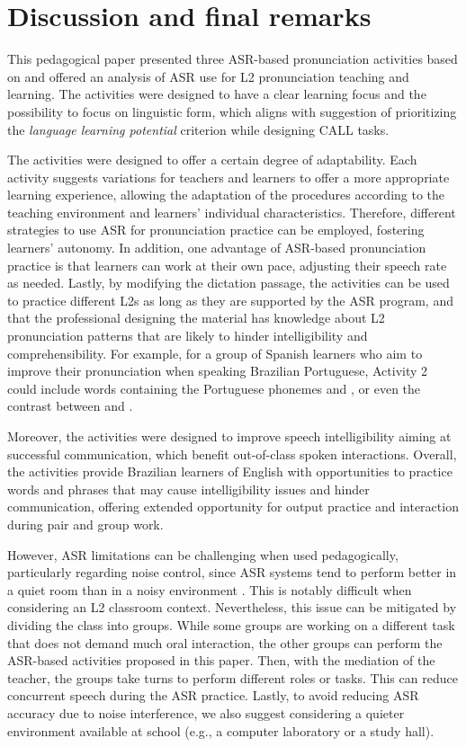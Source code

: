\documentclass[english]{textolivre}
\begin{document}
\section{Discussion and final
remarks}\label{sec-discussion}

This pedagogical paper presented three ASR-based pronunciation
activities based on \textcite{gottardi2023} and offered an analysis of ASR use
for L2 pronunciation teaching and learning. The activities were designed
to have a clear learning focus and the possibility to focus on
linguistic form, which aligns with \textcite{chapelle2001} suggestion of
prioritizing the \emph{language learning potential} criterion while
designing CALL tasks.


The activities were designed to offer a certain degree of adaptability.
Each activity suggests variations for teachers and learners to offer a
more appropriate learning experience, allowing the adaptation of the
procedures according to the teaching environment and learners'
individual characteristics. Therefore, different strategies to use ASR
for pronunciation practice can be employed, fostering learners'
autonomy. In addition, one advantage of ASR-based pronunciation practice
is that learners can work at their own pace, adjusting their speech rate
as needed. Lastly, by modifying the dictation passage, the activities
can be used to practice different L2s as long as they are supported by
the ASR program, and that the professional designing the material has
knowledge about L2 pronunciation patterns that are likely to hinder
intelligibility and comprehensibility. For example, for a group of
Spanish learners who aim to improve their pronunciation when speaking
Brazilian Portuguese, Activity 2 could include words containing the
Portuguese phonemes  and , or even the contrast between  and .

Moreover, the activities were designed to improve speech intelligibility
aiming at successful communication, which benefit out-of-class spoken
interactions. Overall, the activities provide Brazilian learners of
English with opportunities to practice words and phrases that may cause
intelligibility issues and hinder communication, offering extended
opportunity for output practice and interaction during pair and group
work.

However, ASR limitations can be challenging when used pedagogically,
particularly regarding noise control, since ASR systems tend to perform
better in a quiet room than in a noisy environment \cite{jurafsky2024,oshaughnessy2024}. This is notably difficult when considering an L2
classroom context. Nevertheless, this issue can be mitigated by dividing
the class into groups. While some groups are working on a different task
that does not demand much oral interaction, the other groups can perform
the ASR-based activities proposed in this paper. Then, with the
mediation of the teacher, the groups take turns to perform different
roles or tasks. This can reduce concurrent speech during the ASR
practice. Lastly, to avoid reducing ASR accuracy due to noise
interference, we also suggest considering a quieter environment
available at school (e.g., a computer laboratory or a study hall).
\end{document}
